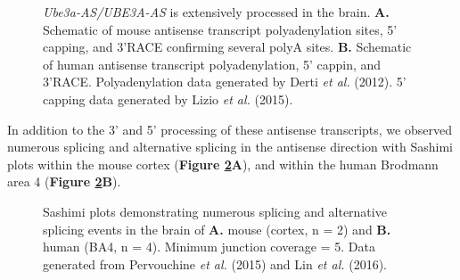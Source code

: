 \begin{figure}
  \centering
  \caption{\textit{Ube3a-AS/UBE3A-AS} is extensively processed in the brain. \textbf{A.} Schematic of mouse antisense transcript polyadenylation sites, 5' capping, and 3'RACE confirming several polyA sites. \textbf{B.} Schematic of human antisense transcript polyadenylation, 5' cappin, and 3'RACE. Polyadenylation data generated by Derti \textit{et al.} (2012). 5' capping data generated by Lizio \textit{et al.} (2015).}
  \label{antisense processing}
\end{figure}

In addition to the 3' and 5' processing of these antisense transcripts, we observed numerous splicing and alternative splicing in the antisense direction with Sashimi plots within the mouse cortex (\textbf{Figure \ref{sashimi brain}A}), and within the human Brodmann area 4 (\textbf{Figure \ref{sashimi brain}B}). 

\begin{figure}
  \centering
  \caption{Sashimi plots demonstrating numerous splicing and alternative splicing events in the brain of \textbf{A.} mouse (cortex, n = 2) and \textbf{B.} human (BA4, n = 4). Minimum junction coverage = 5. Data generated from Pervouchine \textit{et al.} (2015) and Lin \textit{et al.} (2016).}
  \label{sashimi brain}
\end{figure}

